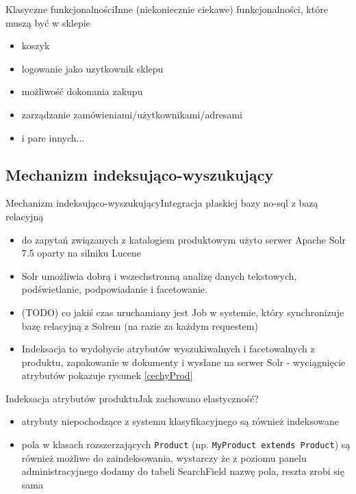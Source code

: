 \documentclass[polish,xcolor=table,9pt,aspectratio=1610,hyperref={pdfpagemode=FullScreen}]{beamer}
\begin{document}
\begin{frame}{Klasyczne funkcjonalności}{Inne (niekoniecznie ciekawe) funkcjonalności, które muszą być w sklepie}
\begin{itemize}
	\item<1-> koszyk
	\item<1-> logowanie jako uzytkownik sklepu 
	\item<1-> możliwość dokonania zakupu
	\item<1-> zarządzanie zamówieniami/użytkownikami/adresami 
	\item<1-> i pare innych... 
\end{itemize}
\end{frame}

\subsection{Mechanizm indeksująco-wyszukujący}

\begin{frame}{Mechanizm indeksująco-wyszukujący}{Integracja płaskiej bazy no-sql z bazą relacyjną}
\begin{itemize}
	\item<1-> do zapytań związanych z katalogiem produktowym użyto serwer Apache Solr 7.5 oparty na silniku Lucene
	\item<2-> Solr umożliwia dobrą i wszechstronną analizę danych tekstowych, podświetlanie, podpowiadanie i facetowanie. 
	\item<3-> (TODO) co jakiś czas uruchamiany jest Job w systemie, który synchronizuje bazę relacyjną z Solrem (na razie za każdym requestem)
	\item<4-> Indeksacja to wydobycie atrybutów wyszukiwalnych i facetowalnych z produktu, zapakowanie w dokumenty i wysłane na serwer Solr - wyciągnięcie atrybutów pokazuje rysunek \ref{cechyProd}
	
\end{itemize}
\end{frame}

\begin{frame}{Indeksacja atrybutów produktu}{Jak zachowano elastyczność?}
\begin{itemize}
	\item<1-> atrybuty niepochodzące z systemu klasyfikacyjnego są również indeksowane
	\item<2-> pola w klasach rozszerzających \texttt{Product} (np. \texttt{MyProduct extends Product}) są również możliwe do zaindeksowania, wystarczy że z poziomu panelu administracyjnego dodamy do tabeli SearchField nazwę pola, reszta zrobi się sama
\end{itemize}
\end{frame}
\end{document}
